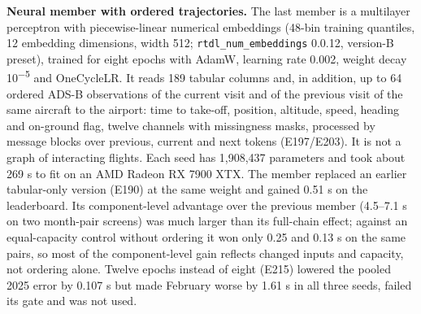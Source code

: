\documentclass[11pt,a4paper]{article}
\begin{document}
\textbf{Neural member with ordered trajectories.} The last member is a multilayer perceptron with piecewise-linear numerical embeddings \autocite{gorishniy2022embeddings} (48-bin training quantiles, 12 embedding dimensions, width 512; \texttt{rtdl\_\allowbreak{}num\_\allowbreak{}embeddings} 0.0.12, version-B preset), trained for eight epochs with AdamW, learning rate 0.002, weight decay 10\textsuperscript{$-$5} and OneCycleLR. It reads 189 tabular columns and, in addition, up to 64 ordered ADS-B observations of the current visit and of the previous visit of the same aircraft to the airport: time to take-off, position, altitude, speed, heading and on-ground flag, twelve channels with missingness masks, processed by message blocks over previous, current and next tokens (E197/E203). It is not a graph of interacting flights. Each seed has 1,908,437 parameters and took about 269 s to fit on an AMD Radeon RX 7900 XTX. The member replaced an earlier tabular-only version (E190) at the same weight and gained 0.51 s on the leaderboard. Its component-level advantage over the previous member (4.5--7.1 s on two month-pair screens) was much larger than its full-chain effect; against an equal-capacity control without ordering it won only 0.25 and 0.13 s on the same pairs, so most of the component-level gain reflects changed inputs and capacity, not ordering alone. Twelve epochs instead of eight (E215) lowered the pooled 2025 error by 0.107 s but made February worse by 1.61 s in all three seeds, failed its gate and was not used.
\end{document}
